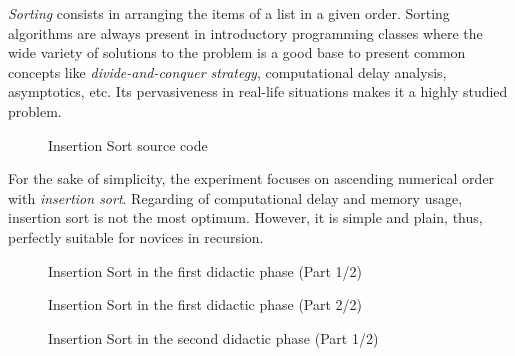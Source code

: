 \emph{Sorting} consists in arranging the items of a list in a given
order. Sorting algorithms are always present in introductory
programming classes where the wide variety of solutions to the problem
is a good base to present common concepts like
\emph{divide\hyp{}and\hyp{}conquer strategy}, computational
delay analysis, asymptotics, etc. Its pervasiveness in
real\hyp{}life situations makes it a highly studied problem.

\renewcommand*\FancyVerbStartString{BEGIN-ISORT}
\renewcommand*\FancyVerbStopString{END-ISORT}
\begin{figure}
  {\footnotesize {}}
  \caption{Insertion Sort source code}
  \label{fig:code:isort}
\end{figure}

For the sake of simplicity, the experiment focuses on ascending
numerical order with \emph{insertion sort}. Regarding of computational
delay and memory usage, insertion sort is not the most optimum.
However, it is simple and plain, thus, perfectly suitable for
novices in recursion.

\begin{figure}[h!]
  \centering
  \caption{Insertion Sort in the first didactic phase (Part 1/2)}
\end{figure}

\begin{figure}[h!]
  \centering
  \caption{Insertion Sort in the first didactic phase (Part 2/2)}
\end{figure}

\begin{figure}[h!]
  \centering
  \caption{Insertion Sort in the second didactic phase (Part 1/2)}
\end{figure}

